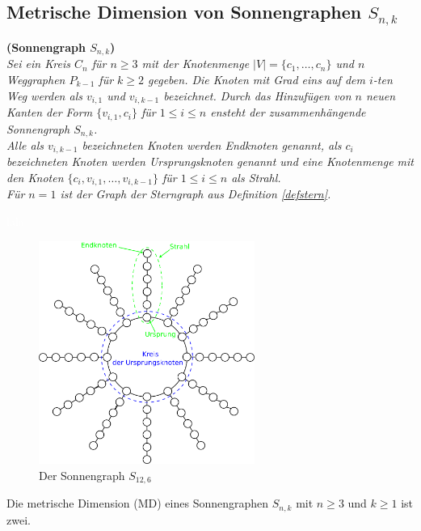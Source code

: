 \subsection{Metrische Dimension von Sonnengraphen $S_{n,k}$}
\begin{defi}{\textbf{(Sonnengraph $S_{n,k}$)}}\\
\emph{Sei ein Kreis $C_n$ für $n \geq 3$ mit der Knotenmenge $|V|=\{ c_1, \ldots , c_n \}$ und $n$ Weggraphen $P_{k-1}$ für $k\geq 2$ gegeben. Die Knoten mit Grad eins auf dem $i$-ten Weg werden als $v_{i,1}$ und $v_{i,k-1}$ bezeichnet. Durch das Hinzufügen von $n$ neuen Kanten der Form $\{v_{i,1},c_i\}$ für $1 \leq i \leq n$ ensteht der zusammenhängende Sonnengraph $S_{n,k}$.\\
Alle als $v_{i,k-1}$ bezeichneten Knoten werden Endknoten genannt, als $c_i$ bezeichneten Knoten werden Ursprungsknoten genannt und eine Knotenmenge mit den Knoten $\{c_i,v_{i,1}, \ldots ,v_{i,k-1}\}$ für $1 \leq i \leq n$ als Strahl.\\
Für $n=1$ ist der Graph der Sterngraph aus Definition \ref{defstern}.}
\end{defi}
\begin{bsp}\textcolor{white}{lala}
\begin{figure}[h!]
\centering
 		 \includegraphics[width=200pt]{bilder/sonne.pdf}
   \caption{Der Sonnengraph $S_{12,6}$}
   \label{bild:sonnengraph}
\end{figure}
\end{bsp}
\begin{lem}
Die metrische Dimension (MD) eines Sonnengraphen $S_{n,k}$ mit $n \geq 3$ und $k \geq 1$ ist zwei. 
\end{lem}
